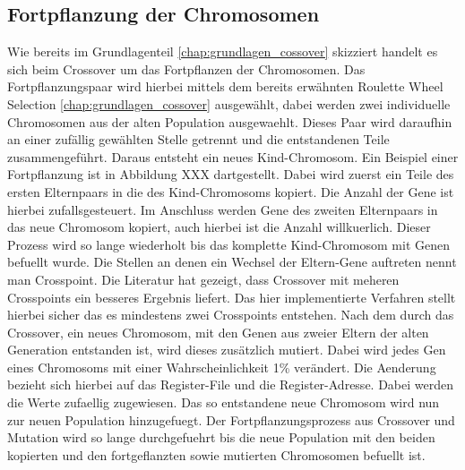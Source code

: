 \subsection{Fortpflanzung der Chromosomen}
Wie bereits im Grundlagenteil \ref{chap:grundlagen_cossover} skizziert handelt es sich beim Crossover um das Fortpflanzen der Chromosomen.
Das Fortpflanzungspaar wird hierbei mittels dem bereits erwähnten Roulette Wheel Selection \ref{chap:grundlagen_cossover} ausgewählt, dabei werden zwei individuelle Chromosomen aus der alten Population ausgewaehlt. Dieses Paar wird daraufhin an einer zufällig gewählten Stelle getrennt und die entstandenen Teile zusammengeführt. Daraus entsteht ein neues Kind-Chromosom. Ein Beispiel einer Fortpflanzung ist in Abbildung XXX dartgestellt. Dabei wird zuerst ein Teile des ersten Elternpaars in die des Kind-Chromosoms kopiert. Die Anzahl der Gene ist hierbei zufallsgesteuert. Im Anschluss werden Gene des zweiten Elternpaars in das neue Chromosom kopiert, auch hierbei ist die Anzahl willkuerlich. Dieser Prozess wird so lange wiederholt bis das komplette Kind-Chromosom mit Genen befuellt wurde.
Die Stellen an denen ein Wechsel der Eltern-Gene auftreten nennt man Crosspoint. Die Literatur hat gezeigt, dass Crossover mit meheren Crosspoints ein besseres Ergebnis liefert. Das hier implementierte Verfahren stellt hierbei sicher das es mindestens zwei Crosspoints entstehen.
Nach dem durch das Crossover, ein neues Chromosom, mit den Genen aus zweier Eltern der alten Generation entstanden ist, wird dieses zusätzlich mutiert. Dabei wird jedes Gen eines Chromosoms mit einer Wahrscheinlichkeit 1\% verändert. Die Aenderung bezieht sich hierbei auf das Register-File und die Register-Adresse. Dabei werden die Werte zufaellig zugewiesen.
Das so entstandene neue Chromosom wird nun zur neuen Population hinzugefuegt. Der Fortpflanzungsprozess aus Crossover und Mutation wird so lange durchgefuehrt bis die neue Population mit den beiden kopierten und den fortgeflanzten sowie mutierten Chromosomen befuellt ist.


